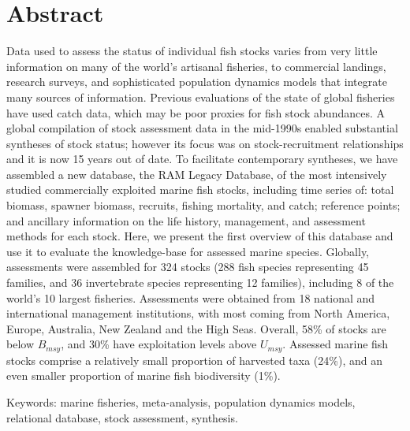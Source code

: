 \section*{Abstract}

Data used to assess the status of individual fish stocks varies from
very little information on many of the world's artisanal fisheries, to
commercial landings, research surveys, and sophisticated population
dynamics models that integrate many sources of information.  Previous
evaluations of the state of global fisheries have used catch data,
which may be poor proxies for fish stock abundances. A global
compilation of stock assessment data in the mid-1990s enabled
substantial syntheses of stock status; however its focus was on
stock-recruitment relationships and it is now 15 years out of date. To
facilitate contemporary syntheses, we have assembled a new database,
the RAM Legacy Database, of the most intensively studied commercially
exploited marine fish stocks, including time series of: total biomass,
spawner biomass, recruits, fishing mortality, and catch; reference
points; and ancillary information on the life history, management, and
assessment methods for each stock.  Here, we present the first
overview of this database and use it to evaluate the knowledge-base
for assessed marine species.  Globally, assessments were assembled for
324 stocks (288 fish species
representing 45 families, and
36 invertebrate species representing
12 families), including 8 of the world's 10
largest fisheries. Assessments were obtained from 18 national and
international management institutions, with most coming from North
America, Europe, Australia, New Zealand and the High Seas.  Overall,
58\% of stocks are below $B_{msy}$, and 30\% have exploitation levels above
$U_{msy}$.  Assessed marine fish stocks comprise a relatively small
proportion of harvested taxa (24\%), and an even smaller proportion of
marine fish biodiversity (1\%).



\noindent Keywords: marine fisheries, meta-analysis, population dynamics models, relational database, stock assessment, synthesis.



